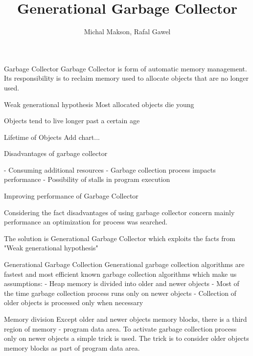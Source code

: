 \documentclass[presentation]{beamer}
\title{Generational Garbage Collector}
\author{Michal Makson, Rafal Gawel}
\institute{AGH}
\date{}
\begin{document}
\begin{frame}
  \titlepage
\end{frame}

\begin{frame}{Garbage Collector}
Garbage Collector is form of automatic memory management.
Its responsibility is to reclaim memory used to allocate objects that are no longer used.
\end{frame}

\begin{frame}{Weak generational hypothesis}
	Most allocated objects die young
	
	Objects tend to live longer past a certain age
\end{frame}

\begin{frame}{Lifetime of Objects}
Add chart...
\end{frame}

\begin{frame}{Disadvantages of garbage collector}
	
	- Consuming additional resources
	- Garbage collection process impacts performance
	- Possibility of stalls in program execution
	
\end{frame}

\begin{frame}{Improving performance of Garbage Collector}
	
	Considering the fact disadvantages of using garbage collector concern mainly performance an optimization for process was searched.
	
	The solution is Generational Garbage Collector which exploits the facts from "Weak generational hypothesis"
	
\end{frame}


\begin{frame}{Generational Garbage Collection}
	Generational garbage collection algorithms are fastest and most efficient known garbage collection algorithms which make us assumptions: 
	- Heap memory is divided into older and newer objects
	- Most of the time garbage collection process runs only on newer objects
	- Collection of older objects is processed only when necessary
	
\end{frame}

\begin{frame}{Memory division}
	Except older and newer objects memory blocks, there is a third region of memory - program data area.
	To activate garbage collection process only on newer objects a simple trick is used.
	The trick is to consider older objects memory blocks as part of program data area.
\end{frame}
\end{document}
